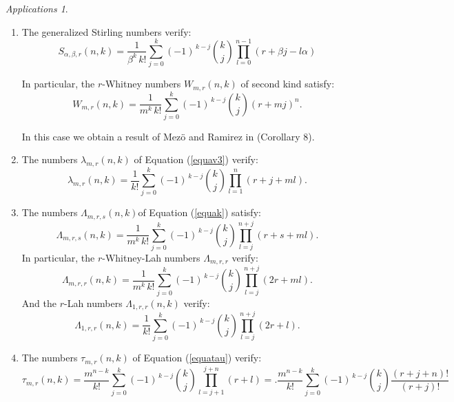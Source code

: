 \documentclass[12pt,a4paper]{article}
\theoremstyle{definition} %
\theoremstyle{remark}
\theoremstyle{examples}
\newtheorem{appli}[theorem]{Applications}
\newcommand{\suit}[1]{{#1}(n,k)}
\begin{document}
\begin{appli}\rm 
	\begin{enumerate}
		\item	 The generalized Stirling numbers verify:
		\begin{equation}
		S_{\alpha,\beta,r}(n,k)=\frac{1}{\beta^k\, k!} \sum_{j=0}^{k} (-1)^{\,k-j} \binom{k}{j} \prod_{l=0}^{n-1} (r + \beta j - l \alpha)
		\end{equation}
		
		In particular,
		the $r$-Whitney numbers $W_{m,r}(n,k)$ of second kind satisfy: 
		\begin{equation}
		W_{m,r}(n,k)= \frac{1}{m^k\, k!} \sum_{j=0}^{k} (-1)^{\,k-j} \binom{k}{j} (r + m j)^n.
		\end{equation}
		
		In this case we obtain a result of Mez\"o and Ramirez in \cite{Mezoram} (Corollary 8).
		\item The numbers $\lambda_{m,r}(n,k)$ of Equation (\ref{equav3}) verify:
		\begin{equation}
		\suit{\lambda_{m,r}} = \frac{1}{k!} \sum_{j=0}^{k} (-1)^{\,k-j} \binom{k}{j} \prod_{l=1}^{n} (r + j + ml).
		\end{equation}
		\item The numbers $\Lambda_{m,r,s}(n,k)$of Equation (\ref{equak}) satisfy:
		\begin{equation}
		\Lambda_{m,r,s}(n,k)= \frac{1}{m^k\, k!} \sum_{j=0}^{k} (-1)^{\,k-j} \binom{k}{j} \prod_{l=j}^{n+j} (r+s + ml).
		\end{equation}
		In particular, the $r$-Whitney-Lah numbers $\Lambda_{m,r,r}$
		verify:\begin{equation}
		\Lambda_{m,r,r}(n,k)= \frac{1}{m^k\, k!} \sum_{j=0}^{k} (-1)^{\,k-j} \binom{k}{j} \prod_{l=j}^{n+j} (2r + ml).
		\end{equation}
		And the $r$-Lah numbers $\Lambda_{1,r,r}(n,k)$
		verify:
		\begin{equation}
		\Lambda_{1,r,r}(n,k)= \frac{1}{k!} \sum_{j=0}^{k} (-1)^{\,k-j} \binom{k}{j} \prod_{l=j}^{n+j} (2r + l).
		\end{equation}
		
		\item The numbers $\tau_{m,r}(n,k)$ of Equation (\ref{equatau}) verify:
		\begin{equation}
		\suit{\tau_{m,r}} = \frac{m^{n-k}}{k!} \sum_{j=0}^{k} (-1)^{\,k-j} \binom{k}{j} \prod_{l=j+1}^{j+n} (r + l)=.\frac{m^{n-k}}{k!} \sum_{j=0}^{k} (-1)^{\,k-j} \binom{k}{j} \frac{(r+j+n)!}{(r+j)!}
		\end{equation}
	\end{enumerate}
\end{appli}
\end{document}
